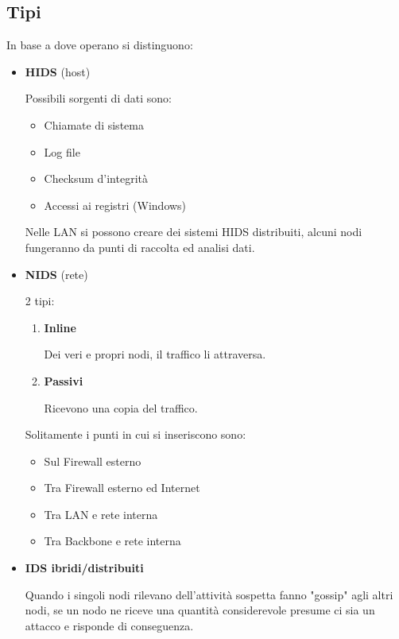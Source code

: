 \documentclass{article}
\begin{document}
\subsection{Tipi}

\noindent In base a dove operano si distinguono:
\begin{itemize}
    \item \textbf{HIDS} (host)

        Possibili sorgenti di dati sono:
        \begin{itemize}
            \item Chiamate di sistema
            \item Log file
            \item Checksum d'integrità
            \item Accessi ai registri (Windows)
        \end{itemize}

        Nelle LAN si possono creare dei sistemi HIDS distribuiti, alcuni nodi fungeranno da punti di raccolta ed analisi dati. 
    
    \item \textbf{NIDS} (rete)

        2 tipi:
        \begin{enumerate}
            \item \textbf{Inline}

                Dei veri e propri nodi, il traffico li attraversa.
            
            \item \textbf{Passivi}

                Ricevono una copia del traffico.
            
        \end{enumerate}

        Solitamente i punti in cui si inseriscono sono:
        \begin{itemize}
            \item Sul Firewall esterno
            \item Tra Firewall esterno ed Internet
            \item Tra LAN e rete interna
            \item Tra Backbone e rete interna
        \end{itemize}
    
    \item \textbf{IDS ibridi/distribuiti}

        Quando i singoli nodi rilevano dell'attività sospetta fanno "gossip" agli altri nodi, se un nodo ne riceve una quantità considerevole presume ci sia un attacco e risponde di conseguenza.\newline
    
\end{itemize}
\end{document}
